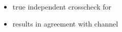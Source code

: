 {\begin{minipage}{0.474\boxwidth}
\begin{itemize}
\setlength\itemsep{0.01em}
\item true independent crosscheck for \BsToDspi
\item results in agreement with \BsToDspi channel
\end{itemize}

\vspace{0.1em}


\end{minipage}}
